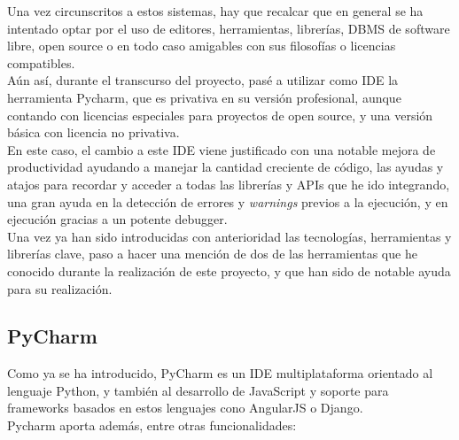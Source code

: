 Una vez circunscritos a estos sistemas, hay que recalcar que en general se ha intentado optar por el uso de editores, herramientas, librerías, DBMS de software libre, open source o en todo caso amigables con sus filosofías o licencias compatibles.\\


Aún así, durante el transcurso del proyecto, pasé a utilizar como IDE la herramienta Pycharm, que es privativa en su versión profesional, aunque contando con licencias especiales para proyectos de open source, y una versión básica con licencia no privativa.\\


En este caso, el cambio a este IDE viene justificado con una notable mejora de productividad ayudando a manejar la cantidad creciente de código, las ayudas y atajos para recordar y acceder a todas las librerías y APIs que he ido integrando, una gran ayuda en la detección de errores y \textit{warnings} previos a la ejecución, y en ejecución gracias a un potente debugger.\\


Una vez ya han sido introducidas con anterioridad las tecnologías, herramientas y librerías clave, paso a hacer una mención de dos de las herramientas que he conocido durante la realización de este proyecto, y que han sido de notable ayuda para su realización.\\

\subsection{PyCharm}
\label{subsec:pycharm}

Como ya se ha introducido, PyCharm es un IDE multiplataforma orientado al lenguaje Python, y también al desarrollo de JavaScript y soporte para frameworks basados en estos lenguajes cono AngularJS o Django.\\


Pycharm aporta además, entre otras funcionalidades:\\

